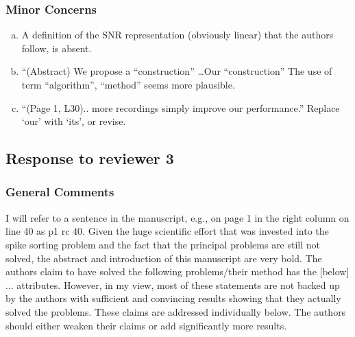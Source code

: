 \subsubsection{Minor Concerns} 

\begin{enumerate}[a.]
	\item A definition of the SNR representation (obviously linear) that the authors follow, is absent.
	
	
\item 	“(Abstract) We propose a ``construction'' \ldots Our ``construction''
	The use of term ``algorithm'', ``method'' seems more plausible.
	

	\item ``(Page 1, L30).. more recordings simply improve our performance.''
	Replace ‘our’ with ‘its’, or revise.


\end{enumerate}




\subsection{Response to reviewer 3}

\subsubsection{General Comments}


I will refer to a sentence in the manuscript, e.g., on page 1 in the right column on line 40 as p1 rc 40.
% 
Given the huge scientific effort that was invested into the spike sorting problem and the fact that the principal problems are still not solved, the abstract and introduction of this manuscript are very bold. The authors claim to have solved the following problems/their method has the [below] ... attributes.
% 
However, in my view, most of these statements are not backed up by the authors with sufficient and convincing results showing that they actually solved the problems. These claims are addressed individually below. The authors should either weaken their claims or add significantly more results.

